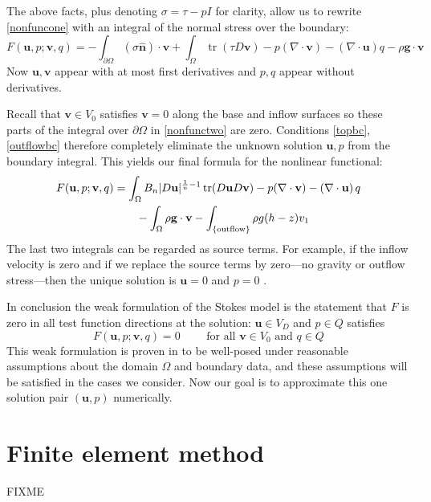 \documentclass[letterpaper,final,12pt,reqno]{amsart}
\newcommand{\trace}{\operatorname{tr}}
\newcommand{\hbn}{\hat{\mathbf{n}}}
\newcommand{\bu}{\mathbf{u}}
\newcommand{\bv}{\mathbf{v}}
\begin{document}
The above facts, plus denoting $\sigma=\tau-pI$ for clarity, allow us to rewrite \eqref{nonfuncone} with an integral of the normal stress over the boundary:
\begin{equation}
F(\bu,p;\bv,q) = -\int_{\partial\Omega} (\sigma \hbn)\cdot \bv + \int_\Omega \trace(\tau D\bv) - p (\nabla \cdot \bv) - \left(\nabla \cdot \bu\right) q - \rho \mathbf{g} \cdot \bv \label{nonfunctwo}
\end{equation}
Now $\bu,\bv$ appear with at most first derivatives and $p,q$ appear without derivatives.

Recall that $\bv\in V_0$ satisfies $\bv=0$ along the base and inflow surfaces so these parts of the integral over $\partial\Omega$ in \eqref{nonfunctwo} are zero.  Conditions \eqref{topbc}, \eqref{outflowbc} therefore completely eliminate the unknown solution $\bu,p$ from the boundary integral.  This yields our final formula for the nonlinear functional:
\begin{align}
F(\bu,p;\bv,q) &= \int_\Omega B_n |D\bu|^{\frac{1}{n} - 1} \trace(D\bu D\bv) - p (\nabla \cdot \bv) - \left(\nabla \cdot \bu\right) q \label{defineF} \\
    &\qquad  - \int_\Omega \rho \mathbf{g} \cdot \bv - \int_{\{\text{outflow}\}} \rho g (h-z) v_1  \notag
\end{align}
The last two integrals can be regarded as source terms.  For example, if the inflow velocity is zero and if we replace the source terms by zero---no gravity or outflow stress---then the unique solution is $\bu=0$ and $p=0$ \cite{Elmanetal2014}.

In conclusion the weak formulation of the Stokes model is the statement that $F$ is zero in all test function directions at the solution: $\bu\in V_D$ and $p\in Q$ satisfies
\begin{equation}
F(\bu,p;\bv,q) = 0 \qquad \text{ for all } \bv\in V_0 \text{ and } q\in Q  \label{weak}
\end{equation}
This weak formulation is proven in \cite{JouvetRappaz2011} to be well-posed under reasonable assumptions about the domain $\Omega$ and boundary data, and these assumptions will be satisfied in the cases we consider.  Now our goal is to approximate this one solution pair $(\bu,p)$ numerically.


\section{Finite element method}

FIXME
\end{document}
